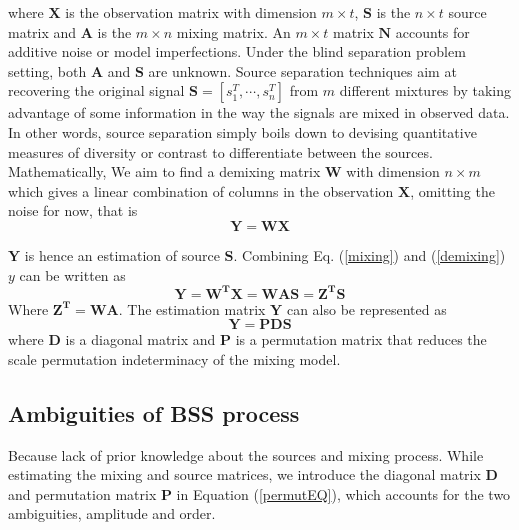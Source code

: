 where $\mathbf{X}$ is the observation matrix with dimension $m \times t$, $\mathbf{S}$ is the $n\times t$ source matrix and $\mathbf{A}$ is the $m \times n$ mixing matrix. An $m \times t$ matrix $\mathbf{N}$ accounts for additive noise or model imperfections. Under the blind separation problem setting, both $\mathbf{A}$ and $\mathbf{S}$ are unknown.  %
Source separation techniques aim at recovering the original signal $\mathbf{S} = [s_1^T,\cdots, s_n^T]$ from $m$ different mixtures by taking advantage of some information in the way the signals are mixed in observed data. In other words, source separation simply boils down to devising quantitative measures of diversity or contrast to differentiate between the sources.\\

Mathematically, We aim to find a demixing matrix $\mathbf{W}$ with dimension $n \times m$ which gives a linear combination of columns in the  observation $\mathbf{X}$, omitting the noise for now, that is
\begin{equation}
    \mathbf{Y} = \mathbf{WX}
    \label{demixing}
\end{equation}

$\mathbf{Y}$ is hence an estimation of source $\mathbf{S}$.
Combining Eq. (\ref{mixing}) and (\ref{demixing}) $y$ can be written as
\begin{equation}
    \mathbf{Y} = \mathbf{W^T} \mathbf{X} = \mathbf{W A S} = \mathbf{Z^T S}
    \label{estimationYandZ}
\end{equation}
Where $\mathbf{Z^T} = \mathbf{W A}$. The estimation matrix $\mathbf{Y}$ can also be represented as 
\begin{equation}
    \mathbf{Y} = \mathbf{PDS} 
    \label{permutEQ}
\end{equation}
where $\mathbf{D}$ is a diagonal matrix and $\mathbf{P}$ is a permutation matrix that reduces the scale permutation indeterminacy of the mixing model.

\subsection{Ambiguities of BSS process}
\label{ambiguitiesBSS}
Because lack of prior knowledge about the sources and mixing process. While estimating the mixing and source matrices, we introduce the diagonal matrix $\mathbf{D}$ and permutation matrix $\mathbf{P}$ in Equation (\ref{permutEQ}), which accounts for the two ambiguities, amplitude and order.\\

